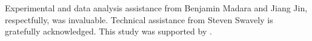 \documentclass[draft]{agujournal2019}
\begin{document}
%




%
%
%
%
%
%
%
%


\acknowledgments
Experimental and data analysis assistance from Benjamin Madara and Jiang Jin, respectfully, was invaluable. 
Technical assistance from Steven Swavely is gratefully acknowledged. This study was supported by .



%
%





%
%
%
%
%
\end{document}
